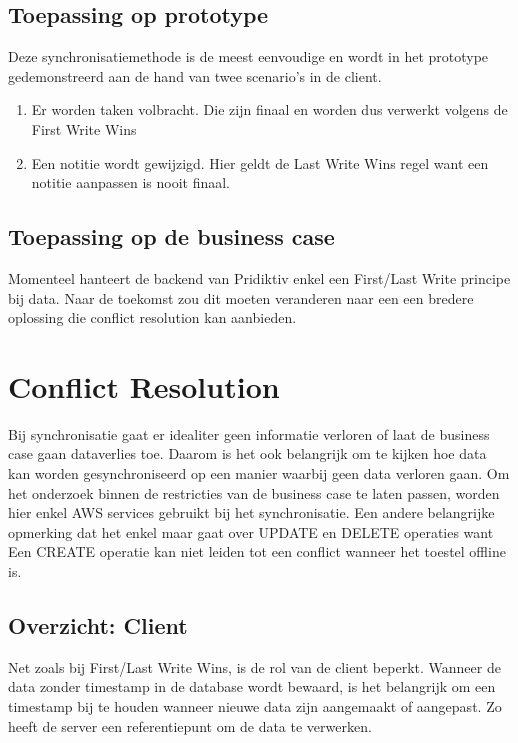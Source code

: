 \subsection{Toepassing op prototype}
Deze synchronisatiemethode is de meest eenvoudige en wordt in het prototype gedemonstreerd aan de hand van twee scenario's in de client.
\begin{enumerate}
\item Er worden taken volbracht. Die zijn finaal en worden dus verwerkt volgens de First Write Wins
\item Een notitie wordt gewijzigd. Hier geldt de Last Write Wins regel want een notitie aanpassen is nooit finaal.
\end{enumerate}
\subsection{Toepassing op de business case}
Momenteel hanteert de backend van Pridiktiv enkel een First/Last Write principe bij data. Naar de toekomst zou dit moeten veranderen naar een een bredere oplossing die conflict resolution kan aanbieden.
\section{Conflict Resolution}
Bij synchronisatie gaat er idealiter geen informatie verloren of laat de business case gaan dataverlies toe. Daarom is het ook belangrijk om te kijken hoe data kan worden gesynchroniseerd op een manier waarbij geen data verloren gaan. Om het onderzoek binnen de restricties van de business case te laten passen, worden hier enkel AWS services gebruikt bij het synchronisatie. Een andere belangrijke opmerking dat het enkel maar gaat over UPDATE en DELETE operaties want Een CREATE operatie kan niet leiden tot een conflict wanneer het toestel offline is.
\subsection{Overzicht: Client}
Net zoals bij First/Last Write Wins, is de rol van de client beperkt. Wanneer de data zonder timestamp in de database wordt bewaard, is het belangrijk om een timestamp bij te houden wanneer nieuwe data zijn aangemaakt of aangepast. Zo heeft de server een referentiepunt om de data te verwerken.
